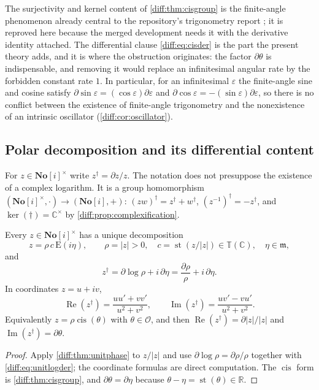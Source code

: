 \documentclass[11pt,letterpaper]{article}
\numberwithin{equation}{section}
\theoremstyle{definition}
\theoremstyle{remark}
\newcommand{\SC}{\mathbf{No}[i]}
\newcommand{\R}{\mathbb R}
\newcommand{\C}{\mathbb C}
\newcommand{\der}{\partial}
\newcommand{\Ofin}{\mathcal O}
\newcommand{\mm}{\mathfrak m}
\newcommand{\st}{\operatorname{st}}
\newcommand{\Ree}{\operatorname{Re}}
\newcommand{\Imm}{\operatorname{Im}}
\newcommand{\cis}{\operatorname{cis}}
\newcommand{\Emm}{\mathrm{E}}
\newcommand{\Tor}{\mathbb T}
\newcommand{\Ker}{\operatorname{ker}}
\newcommand{\abs}[1]{\lvert#1\rvert}
\begin{document}
The surjectivity and kernel content of \cref{diff:thm:cisgroup} is the
finite-angle phenomenon already central to the repository's trigonometry report
\cite{RepoTrig}; it is reproved here because the merged development needs it
with the derivative identity attached. The differential clause
\cref{diff:eq:cisder} is the part the present theory adds, and it is where the
obstruction originates: the factor $\der\theta$ is indispensable, and removing
it would replace an infinitesimal angular rate by the forbidden constant rate
$1$. In particular, for an infinitesimal $\varepsilon$ the finite-angle sine
and cosine satisfy
$\der\sin\varepsilon=(\cos\varepsilon)\der\varepsilon$ and
$\der\cos\varepsilon=-(\sin\varepsilon)\der\varepsilon$, so there is no
conflict between the existence of finite-angle trigonometry and the
nonexistence of an intrinsic oscillator (\cref{diff:cor:oscillator}).

\subsection{Polar decomposition and its differential content}
\label{diff:sub:polar}

\begin{definition}
\label{diff:def:logder}
For $z\in\SC^{\times}$ write $z^{\dagger}=\der z/z$. The notation does not
presuppose the existence of a complex logarithm. It is a group homomorphism
$(\SC^{\times},\cdot)\to(\SC,+)$: $(zw)^{\dagger}=z^{\dagger}+w^{\dagger}$,
$(z^{-1})^{\dagger}=-z^{\dagger}$, and $\Ker(\dagger)=\C^{\times}$ by
\cref{diff:prop:complexification}.
\end{definition}

\begin{corollary}
\label{diff:cor:polar}
Every $z\in\SC^{\times}$ has a unique decomposition
\begin{equation}\label{diff:eq:polar}
 z=\rho\,c\,\Emm(i\eta),
 \qquad \rho=\abs z>0,\quad c=\st(z/\abs z)\in\Tor(\C),\quad\eta\in\mm,
\end{equation}
and
\begin{equation}\label{diff:eq:polarlogder}
 z^{\dagger}=\der\log\rho+i\,\der\eta
 =\frac{\der\rho}{\rho}+i\,\der\eta .
\end{equation}
In coordinates $z=u+iv$,
\begin{equation}\label{diff:eq:coordinates}
 \Ree(z^{\dagger})=\frac{uu'+vv'}{u^{2}+v^{2}},
 \qquad
 \Imm(z^{\dagger})=\frac{uv'-vu'}{u^{2}+v^{2}}.
\end{equation}
Equivalently $z=\rho\cis(\theta)$ with $\theta\in\Ofin$, and then
$\Ree(z^{\dagger})=\der\abs z/\abs z$ and
$\Imm(z^{\dagger})=\der\theta$.
\end{corollary}
\begin{proof}
Apply \cref{diff:thm:unitphase} to $z/\abs z$ and use
$\der\log\rho=\der\rho/\rho$ together with \cref{diff:eq:unitlogder}; the
coordinate formulas are direct computation. The $\cis$ form is
\cref{diff:thm:cisgroup}, and $\der\theta=\der\eta$ because
$\theta-\eta=\st(\theta)\in\R$.
\end{proof}
\end{document}
